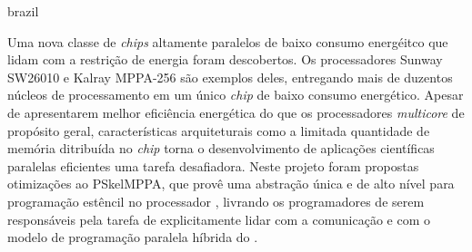 \swapcontents



{
    \begin{otherlanguage*}{brazil}
    \begin{resumo}[Resumo]

        Uma nova classe de \textit{chips} altamente paralelos de baixo consumo energéitco que lidam com a restrição de energia foram descobertos. Os processadores Sunway SW26010 e Kalray MPPA-256 são exemplos deles, entregando mais de duzentos núcleos de processamento em um único \textit{chip} de baixo consumo energético. Apesar de apresentarem melhor eficiência energética do que os processadores \textit{multicore} de propósito geral, características arquiteturais como a limitada quantidade de memória ditribuída no \textit{chip} torna o desenvolvimento de aplicações científicas paralelas eficientes uma tarefa desafiadora. Neste projeto foram propostas otimizações ao \fw PSkelMPPA, que provê uma abstração única e de alto nível para programação estêncil no processador \mppa, livrando os programadores de serem responsáveis pela tarefa de explicitamente lidar com a comunicação e com o modelo de programação paralela híbrida do \mppa.


    \end{resumo}
    \end{otherlanguage*}
}



